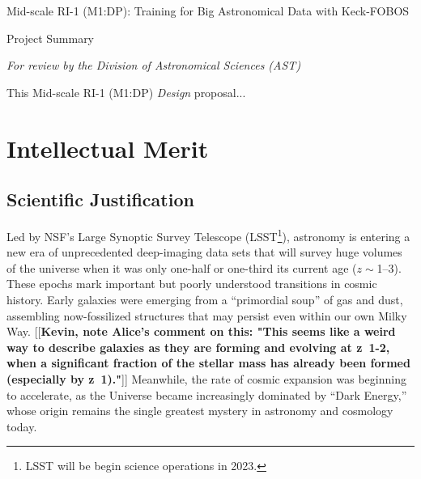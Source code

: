 \documentclass[oneside,11pt]{amsart}
\newcommand{\comment}[2][todo]{{\color{#1}[[{\bf #2}]]}}
\begin{document}


\vspace*{-1.5cm}

\centerline{\textsf {\Large Mid-scale RI-1 (M1:DP): Training for Big Astronomical Data with Keck-FOBOS}}
\centerline{\textsf {\large Project Summary}}
\centerline{\emph{{\small For review by the Division of Astronomical Sciences (AST)}}}


 This Mid-scale RI-1 (M1:DP) \emph{Design} proposal...



\clearpage
\setcounter{page}{1}

\section{Intellectual Merit}
\label{sec:im}

\subsection{Scientific Justification} 



Led by NSF's Large Synoptic Survey Telescope (LSST\footnote{LSST will be
begin science operations in 2023.}), astronomy is entering a new era of
unprecedented deep-imaging data sets that will survey huge volumes of
the universe when it was only one-half or one-third its current age ($z
\sim $1--3).  These epochs mark important but poorly understood
transitions in cosmic history. Early galaxies were emerging from a
``primordial soup'' of gas and dust, assembling now-fossilized
structures that may persist even within our own Milky Way.
\comment{Kevin, note Alice's comment on this: "This seems like a weird
way to describe galaxies as they are forming and evolving at z~1-2, when
a significant fraction of the stellar mass has already been formed
(especially by z~1)."}  Meanwhile, the rate of cosmic expansion was
beginning to accelerate, as the Universe became increasingly dominated
by ``Dark Energy,'' whose origin remains the single greatest mystery in
astronomy and cosmology today.
\end{document}
